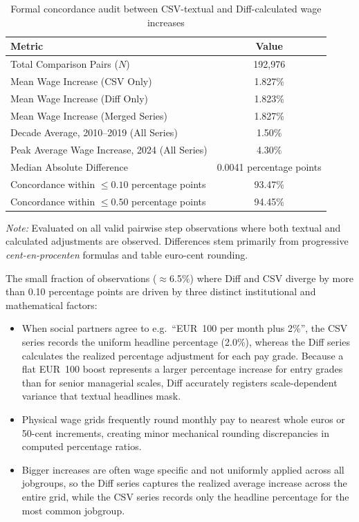 \begin{table}[H]
    \centering
    \caption{Formal concordance audit between CSV-textual and Diff-calculated wage increases}
    \label{tab:diff_vs_csv_audit}
    \begin{tabular}{lc}
        \hline\hline
        Metric & Value \\
        \hline
        Total Comparison Pairs ($N$) & 192,976 \\
        Mean Wage Increase (CSV Only) & 1.827\% \\
        Mean Wage Increase (Diff Only) & 1.823\% \\
        Mean Wage Increase (Merged Series) & 1.827\% \\
        Decade Average, 2010--2019 (All Series) & 1.50\% \\
        Peak Average Wage Increase, 2024 (All Series) & 4.30\% \\
        Median Absolute Difference & 0.0041 percentage points \\
        Concordance within $\le 0.10$ percentage points & 93.47\% \\
        Concordance within $\le 0.50$ percentage points & 94.45\% \\
        \hline\hline
    \end{tabular}
    \vspace{1ex}
    \parbox{\linewidth}{\footnotesize \textit{Note:} Evaluated on all valid pairwise step observations where both textual and calculated adjustments are observed. Differences stem primarily from progressive \emph{cent-en-procenten} formulas and table euro-cent rounding.}
\end{table}

The small fraction of observations ($\approx$6.5\%) where Diff and CSV diverge by more than 0.10 percentage points are driven by three distinct institutional and mathematical factors:
\begin{itemize}
    \item When social partners agree to e.g.\ ``EUR~100 per month plus 2\%'', the CSV series records the uniform headline percentage (2.0\%), whereas the Diff series calculates the realized percentage adjustment for each pay grade. Because a flat EUR~100 boost represents a larger percentage increase for entry grades than for senior managerial scales, Diff accurately registers scale-dependent variance that textual headlines mask.
    \item Physical wage grids frequently round monthly pay to nearest whole euros or 50-cent increments, creating minor mechanical rounding discrepancies in computed percentage ratios.
    \item Bigger increases are often wage specific and not uniformly applied across all jobgroups, so the Diff series captures the realized average increase across the entire grid, while the CSV series records only the headline percentage for the most common jobgroup.
\end{itemize}

